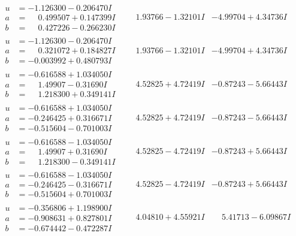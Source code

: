 \documentclass[1p]{elsarticle_modified}
\theoremstyle{definition}
\begin{document}
$$\begin{array}{c|c|c}
\begin{aligned}
u &= -1.126300 - 0.206470 I \\
a &= \phantom{-}0.499507 + 0.147399 I \\
b &= \phantom{-}0.427226 - 0.266230 I\end{aligned}
 & \phantom{-}1.93766 - 1.32101 I & -4.99704 + 4.34736 I \\ \hline\begin{aligned}
u &= -1.126300 - 0.206470 I \\
a &= \phantom{-}0.321072 + 0.184827 I \\
b &= -0.003992 + 0.480793 I\end{aligned}
 & \phantom{-}1.93766 - 1.32101 I & -4.99704 + 4.34736 I \\ \hline\begin{aligned}
u &= -0.616588 + 1.034050 I \\
a &= \phantom{-}1.49907 - 0.31690 I \\
b &= \phantom{-}1.218300 + 0.349141 I\end{aligned}
 & \phantom{-}4.52825 + 4.72419 I & -0.87243 - 5.66443 I \\ \hline\begin{aligned}
u &= -0.616588 + 1.034050 I \\
a &= -0.246425 + 0.316671 I \\
b &= -0.515604 - 0.701003 I\end{aligned}
 & \phantom{-}4.52825 + 4.72419 I & -0.87243 - 5.66443 I \\ \hline\begin{aligned}
u &= -0.616588 - 1.034050 I \\
a &= \phantom{-}1.49907 + 0.31690 I \\
b &= \phantom{-}1.218300 - 0.349141 I\end{aligned}
 & \phantom{-}4.52825 - 4.72419 I & -0.87243 + 5.66443 I \\ \hline\begin{aligned}
u &= -0.616588 - 1.034050 I \\
a &= -0.246425 - 0.316671 I \\
b &= -0.515604 + 0.701003 I\end{aligned}
 & \phantom{-}4.52825 - 4.72419 I & -0.87243 + 5.66443 I \\ \hline\begin{aligned}
u &= -0.356806 + 1.198900 I \\
a &= -0.908631 + 0.827801 I \\
b &= -0.674442 - 0.472287 I\end{aligned}
 & \phantom{-}4.04810 + 4.55921 I & \phantom{-}5.41713 - 6.09867 I \\ \hline\begin{aligned}

\end{aligned}
\end{array}$$
\end{document}
